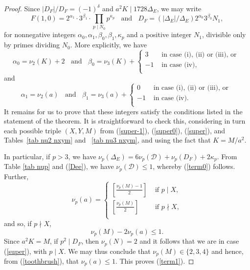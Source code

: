 \begin{proof}
Since $|D_F|/D_F = (-1)^\delta$ and $a^2 K \mid 1728 \Delta_E$, we may write
$$
F(1,0) = 2^{\alpha_1} \cdot 3^{\beta_1} \cdot \prod_{p \mid N_0} p^{\kappa_p}
\; \; \mbox{ and } \; \; D_F = (|\Delta_E|/\Delta_E) 2^{\alpha_0} 3^{\beta_0} N_1,
$$
for nonnegative integers $\alpha_0, \alpha_1, \beta_0, \beta_1, \kappa_p$ and a positive integer $N_1$,  divisible only by primes dividing $N_0$. More explicitly, we have 
$$
\alpha_0 = \nu_2 (K) + 2\; \; \mbox{ and } \;  \; \beta_0 =\nu_3 (K) + 
\left\{ 
\begin{array}{rl}
3 & \mbox{ in case (i), (ii) or (iii), or } \\
-1& \mbox{ in case (iv),} \\
\end{array}
\right.
$$
and
$$
\alpha_1 = \nu_2 (a) \; \; \mbox{ and } \;  \; \beta_1 =\nu_3 (a) + 
\left\{ 
\begin{array}{rl}
0 & \mbox{ in case (i), (ii) or (iii), or } \\
-1& \mbox{ in case (iv). } \\
\end{array}
\right.
$$
It remains for us to prove that these integers satisfy the conditions listed in the statement of the theorem. It is straightforward to check this,  considering in turn each possible triple $(X,Y,M)$ from 
(\ref{super-1}), (\ref{super0}), (\ref{super}), and Tables~\ref{tab nu2 nxym} and ~\ref{tab nu3 nxym}, and using the fact that $K = M/a^2$. 

In particular, if $p > 3$, we have $\nu_p(\Delta_E) = 6 \nu_p(\mathcal{D}) + \nu_p (D_F) + 2 \kappa_p$. From Table \ref{tab nup} and (\ref{Dee}), we have $\nu_p(\mathcal{D}) \leq 1$, whereby (\ref{term0}) follows. 
Further,
\begin{equation} \label{toothbrush}
\nu_p(a) = 
\left\{\begin{array}{ll}
\left[ \frac{\nu_p(M)-1}{2} \right] & \mbox{ if } p \mid X, \\
\left[ \frac{\nu_p(M)}{2} \right] & \mbox{ if } p \nmid X, \\
\end{array}
\right.
\end{equation}
and so, if $p \nmid X$, 
$$
\nu_p(M)-2 \nu_p(a) \leq 1.
$$
Since $a^2K=M$, if $p^2 \mid D_F$, then $\nu_p(N)=2$ and it follows that we are in case (\ref{super}), with $p \mid X$. We may thus conclude that $\nu_p (M) \in \{ 2, 3, 4 \}$ and hence, from (\ref{toothbrush}), that $\nu_p(a) \leq 1$. This proves (\ref{term1}).


\end{proof}
